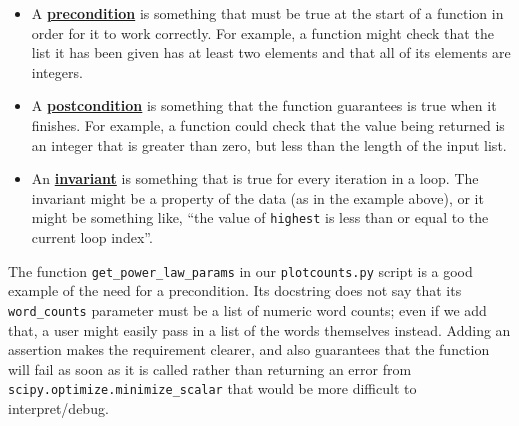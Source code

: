 \documentclass[
]{krantz}
\newcommand{\gref}[2]{\hyperlink{#2}{\textbf{#1}}}
\begin{document}
\begin{itemize}
\item
  A \gref{precondition}{precondition}
  is something that must be true at the start of a function
  in order for it to work correctly.
  For example,
  a function might check that the list it has been given has at least two elements
  and that all of its elements are integers.
\item
  A \gref{postcondition}{postcondition}
  is something that the function guarantees is true
  when it finishes.
  For example,
  a function could check that the value being returned is an integer
  that is greater than zero,
  but less than the length of the input list.
\item
  An \gref{invariant}{invariant}
  is something that is true for every iteration in a loop.
  The invariant might be a property of the data (as in the example above),
  or it might be something like,
  ``the value of \texttt{highest} is less than or equal to the current loop index''.
\end{itemize}

The function \texttt{get\_power\_law\_params} in our \texttt{plotcounts.py} script
is a good example of the need for a precondition.
Its docstring does not say that its \texttt{word\_counts} parameter must be a list of numeric word counts;
even if we add that,
a user might easily pass in a list of the words themselves instead.
Adding an assertion makes the requirement clearer,
and also guarantees that the function will fail as soon as it is called
rather than returning an error from \texttt{scipy.optimize.minimize\_scalar}
that would be more difficult to interpret/debug.
\end{document}
